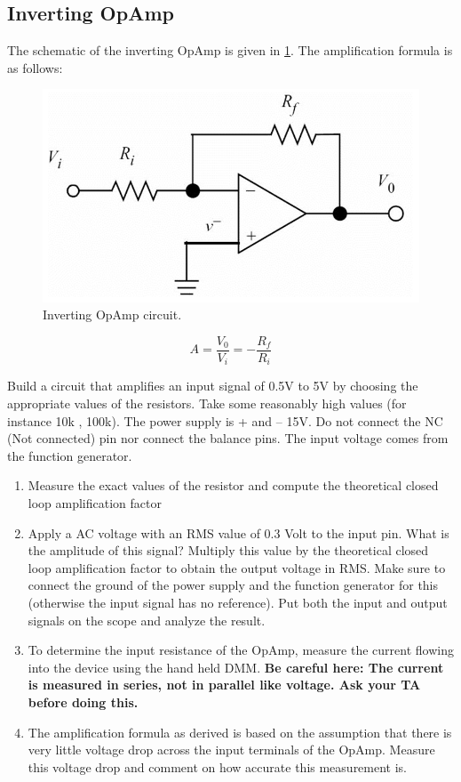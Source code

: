 \documentclass[11pt,letterpaper]{article}
\begin{document}
\subsection{Inverting OpAmp}

The schematic of the inverting OpAmp is given in \ref{fig:Lab5_InvertingOpAmp}. The amplification formula is as follows:

\begin{figure}
\centering
\includegraphics[width=0.6\linewidth]{Lab5_InvertingOpAmp}
\caption{Inverting OpAmp circuit.}
\label{fig:Lab5_InvertingOpAmp}
\end{figure}

\begin{equation} \label{Eqn:OpAmpsPassiveFilters1}
A = \dfrac{V_0}{V_i} = - \dfrac{R_f}{R_i}
\end{equation}

Build a circuit that amplifies an input signal of 0.5V to 5V by choosing the appropriate values of the resistors. Take some reasonably high values (for instance 10k , 100k). The power supply is + and – 15V. Do not connect the NC (Not connected) pin nor connect the balance pins. The input voltage comes from the function generator.

\begin{enumerate}
\item Measure the exact values of the resistor and compute the theoretical closed loop amplification factor
\item Apply a AC voltage with an RMS value of 0.3 Volt to the input pin. What is the amplitude of this signal? Multiply this value by the theoretical closed loop amplification factor to obtain the output voltage in RMS. Make sure to connect the ground of the power supply and the function generator for this (otherwise the input signal has no reference). Put both the input and output signals on the scope and analyze the result.
\item To determine the input resistance of the OpAmp, measure the current flowing into the device using the hand held DMM. \textbf{Be careful here: The current is measured in series, not in parallel like voltage.  Ask your TA before doing this.}
\item The amplification formula as derived is based on the assumption that there is very little voltage drop across the input terminals of the OpAmp. Measure this voltage drop and comment on how accurate this measurement is.
\end{enumerate}
\end{document}

